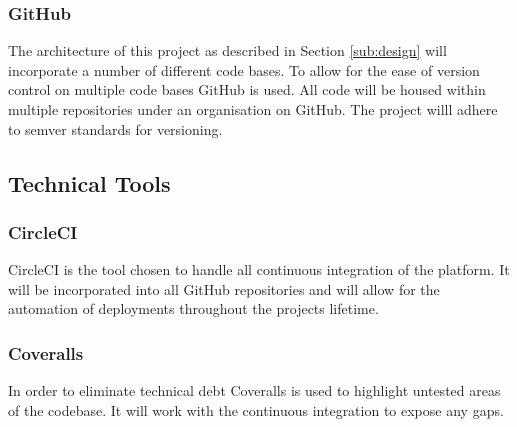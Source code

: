 \subsubsection{GitHub}
\label{sub:git}
The architecture of this project as described in Section \ref{sub:design} will incorporate a number of different code bases. To allow for the ease of version control on multiple code bases GitHub is used. All code will be housed within multiple repositories under an organisation on GitHub. The project willl adhere to semver standards for versioning.
\subsection{Technical Tools}
\subsubsection{CircleCI}
\label{sub:circle}
CircleCI is the tool chosen to handle all continuous integration of the platform. It will be incorporated into all GitHub repositories and will allow for the automation of deployments throughout the projects lifetime.
\subsubsection{Coveralls}
\label{sub:cover}
In order to eliminate technical debt Coveralls is used to highlight untested areas of the codebase. It will work with the continuous integration to expose any gaps.